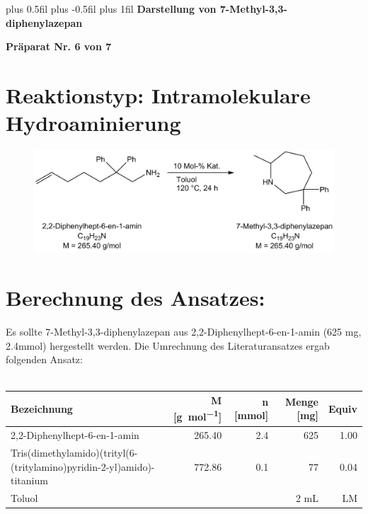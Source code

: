 \documentclass[12pt]{article}
\begin{document}
\begin{onehalfspace}

\begingroup
\leftskip=0cm plus 0.5fil \rightskip=0cm plus -0.5fil
\parfillskip=0cm plus 1fil
 \textbf{\large Darstellung von 7-Methyl-3,3-diphenylazepan}\par
\endgroup

\begin{center}
 \textbf{Präparat Nr. 6 von 7}
\end{center}
\section{Reaktionstyp: \textnormal{Intramolekulare Hydroaminierung} }
\begin{figure}[ht]
\centering
\includegraphics[scale=0.3]{reaktion.png}
\end{figure}

\section{Berechnung des Ansatzes: }
Es sollte 7-Methyl-3,3-diphenylazepan aus 2,2-Diphenylhept-6-en-1-amin (625 \si{\milli\gram}, 2.4\si{\milli\mol}) hergestellt werden. Die Umrechnung des Literaturansatzes ergab folgenden Ansatz:\cite{vor}\\\\
\noindent
\begin{tabularx}{\textwidth}{Xrrrr}
\toprule
\textbf{ Bezeichnung }&\textbf{M [\si{\gram\per\mol}]} & \textbf{ n [\si{\milli\mol}]} & \textbf{Menge [\si{\milli\gram}]}& \textbf{Equiv}\\
\midrule
 2,2-Diphenylhept-6-en-1-amin                    & 265.40   & 2.4  & 625  & 1.00 \\
 Tris(dimethylamido)(trityl(6-(tritylamino)pyridin-2-yl)amido)-titanium    & 772.86   & 0.1  & 77   & 0.04 \\
 Toluol &   &  & 2 \si{\milli\liter} & LM \\
\bottomrule
\end{tabularx}\\

\end{onehalfspace}
\end{document}
